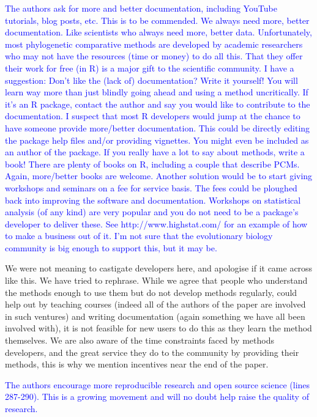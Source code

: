 \documentclass[12pt]{letter}
\begin{document}
\begin{letter}{}
\textcolor{blue}{The authors ask for more and better documentation, including YouTube tutorials, blog posts, etc. This is to be commended. We always need more, better documentation. Like scientists who always need more, better data. Unfortunately, most phylogenetic comparative methods are developed by academic researchers who may not have the resources (time or money) to do all this. That they offer their work for free (in R) is a major gift to the scientific community. I have a suggestion: Don't like the (lack of) documentation? Write it yourself! You will learn way more than just blindly going ahead and using a method uncritically. If it's an R package, contact the author and say you would like to contribute to the documentation. I suspect that most R developers would jump at the chance to have someone provide more/better documentation. This could be directly editing the package help files and/or providing vignettes. You  might even be included as an author of the package. If you really have a lot to say about methods, write a book! There are plenty of books on R, including a couple that describe PCMs. Again, more/better books are welcome. Another solution would be to start giving workshops and seminars on a fee for service basis. The fees could be ploughed back into improving the software and documentation. Workshops on statistical analysis (of any kind) are very popular and you do not need to be a package's developer to deliver these. See  http://www.highstat.com/ for an example of how to make a business out of it. I'm not sure that the evolutionary biology community is big enough to support this, but it may be.}

We were not meaning to castigate developers here, and apologise if it came across like this. We have tried to rephrase. While we agree that people who understand the methods enough to use them but do not develop methods regularly, could help out by teaching courses (indeed all of the authors of the paper are involved in such ventures) and writing documentation (again something we have all been involved with), it is not feasible for new users to do this as they learn the method themselves. We are also aware of the time constraints faced by methods developers, and the great service they do to the community by providing their methods, this is why we mention incentives near the end of the paper. 

\textcolor{blue}{The authors encourage more reproducible research and open source science (lines 287-290). This is a growing movement and will no doubt help raise the quality of research.}


\end{letter}
\end{document}
